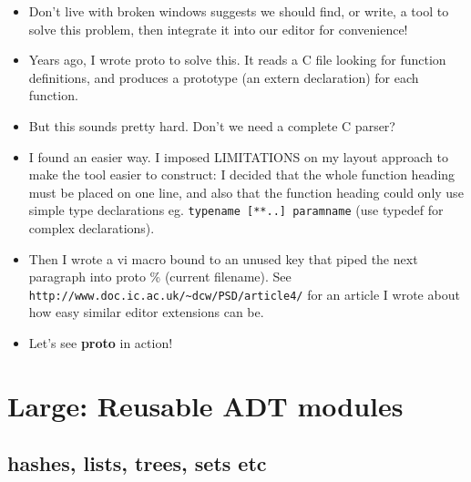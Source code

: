 \documentclass[aspectratio=169]{beamer}
\newcommand{\pitem}{\pause \item}
\begin{document}
\begin{frame}[fragile]
    \begin{itemize}
    \item
      \alert{Don't live with broken windows} suggests we should find, or
      write, a tool to solve this problem,
      then integrate it into our editor for convenience!

    \pitem
      Years ago, I wrote \alert{proto} to solve this.
      It reads a C file looking for function definitions, and
      produces a prototype (an extern declaration) for each function.

    \pitem
      But this sounds pretty hard.  Don't we need a complete C
      parser?
    \pitem
      I found an easier way.
      I imposed LIMITATIONS on my layout approach to make the tool easier
      to construct: I decided that the
      \alert{whole function heading must be placed on one line}, and
      also that the function heading could
      \alert{only use simple type declarations}
      eg. \verb+typename [**..] paramname+
      (use \alert{typedef} for complex declarations).

    \pitem
      Then I wrote a vi macro bound to an unused key that
      piped the next paragraph into \alert{proto \%} (current filename).
      \pause
      See
      \verb+http://www.doc.ic.ac.uk/~dcw/PSD/article4/+
      for an article I wrote about how easy similar editor extensions
      can be.

    \pitem
     Let's see {\bf proto} in action!


    \end{itemize}
\end{frame}

\section{Large: Reusable ADT modules}
\subsection{hashes, lists, trees, sets etc}
\end{document}
